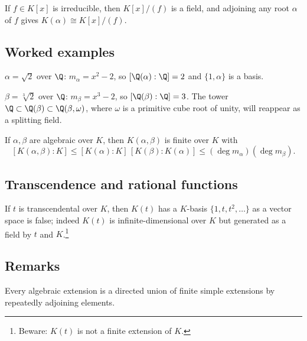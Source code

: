\begin{proposition}
If $f\in K[x]$ is irreducible, then $K[x]/(f)$ is a field, and adjoining any root $\alpha$ of $f$ gives $K(\alpha)\cong K[x]/(f)$.
\end{proposition}

\subsection{Worked examples}
\begin{example}
$\alpha=\sqrt{2}$ over $\Q$: $m_\alpha=x^2-2$, so $[\Q(\alpha):\Q]=2$ and $\{1,\alpha\}$ is a basis.
\end{example}
\begin{example}
$\beta=\sqrt[3]{2}$ over $\Q$: $m_\beta=x^3-2$, so $[\Q(\beta):\Q]=3$. The tower $\Q\subset \Q(\beta)\subset \Q(\beta,\omega)$, where $\omega$ is a primitive cube root of unity, will reappear as a splitting field.
\end{example}
\begin{example}
If $\alpha,\beta$ are algebraic over $K$, then $K(\alpha,\beta)$ is finite over $K$ with
\[
[K(\alpha,\beta):K]\le [K(\alpha):K]\,[K(\beta):K(\alpha)]\le (\deg m_\alpha)(\deg m_\beta).
\]
\end{example}

\subsection{Transcendence and rational functions}
\begin{example}
If $t$ is transcendental over $K$, then $K(t)$ has a $K$-basis $\{1,t,t^2,\dots\}$ as a vector space is false; indeed $K(t)$ is infinite-dimensional over $K$ but generated as a field by $t$ and $K$.\footnote{Beware: $K(t)$ is not a finite extension of $K$.}
\end{example}

\subsection{Remarks}
\begin{remark}
Every algebraic extension is a directed union of finite simple extensions by repeatedly adjoining elements.
\end{remark}
